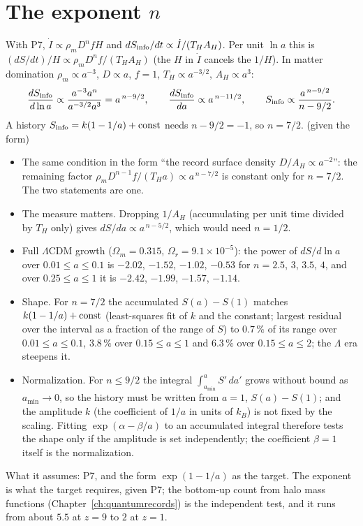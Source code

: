 \section{The exponent $n$}\label{app:der:exponent}
With P7, $\dot I\propto\rho_mD^nfH$ and $dS_{\rm info}/dt\propto\dot I/(T_HA_H)$. Per unit $\ln a$ this is $(dS/dt)/H\propto\rho_mD^nf/(T_HA_H)$ (the $H$ in
$\dot I$ cancels the $1/H$). In matter domination $\rho_m\propto a^{-3}$, $D\propto a$, $f=1$, $T_H\propto a^{-3/2}$, $A_H\propto a^3$:
\begin{equation}
\frac{dS_{\rm info}}{d\ln a}\propto\frac{a^{-3}a^n}{a^{-3/2}a^3}=a^{\,n-9/2},\qquad
\frac{dS_{\rm info}}{da}\propto a^{\,n-11/2},\qquad S_{\rm info}\propto\frac{a^{\,n-9/2}}{n-9/2}.
\end{equation}
A history $S_{\rm info}=k(1-1/a)+{\rm const}$ needs $n-9/2=-1$, so $n=7/2$. \derived{} (given the form)
\begin{itemize}
\item The same condition in the form ``the record surface density $D/A_H\propto a^{-2}$'': the remaining factor $\rho_mD^{n-1}f/(T_Ha)\propto a^{\,n-7/2}$ is
constant only for $n=7/2$. The two statements are one. \derived
\item The measure matters. Dropping $1/A_H$ (accumulating per unit time divided by $T_H$ only) gives $dS/da\propto a^{\,n-5/2}$, which would need $n=1/2$. \derived
\item Full $\Lambda$CDM growth ($\Omega_m=0.315$, $\Omega_r=9.1\times10^{-5}$): the power of $dS/d\ln a$ over $0.01\le a\le0.1$ is $-2.02$, $-1.52$, $-1.02$,
$-0.53$ for $n=2.5$, $3$, $3.5$, $4$, and over $0.25\le a\le1$ it is $-2.42$, $-1.99$, $-1.57$, $-1.14$. \calc
\item Shape. For $n=7/2$ the accumulated $S(a)-S(1)$ matches $k(1-1/a)+{\rm const}$ (least-squares fit of $k$ and the constant; largest residual over the interval as a fraction of the range of $S$) to $0.7\,\%$ of its range over $0.01\le a\le0.1$, $3.8\,\%$ over
$0.15\le a\le1$ and $6.3\,\%$ over $0.15\le a\le2$; the $\Lambda$ era steepens it. \calc
\item Normalization. For $n\le9/2$ the integral $\int_{a_{\min}}^aS'\,da'$ grows without bound as $a_{\min}\to0$, so the history must be written from
$a=1$, $S(a)-S(1)$; and the amplitude $k$ (the coefficient of $1/a$ in units of $k_B$) is not fixed by the scaling. Fitting $\exp(\alpha-\beta/a)$ to an
accumulated integral therefore tests the shape only if the amplitude is set independently; the coefficient $\beta=1$ itself is the
normalization. \openprob
\end{itemize}
What it assumes: P7, and the form $\exp(1-1/a)$ as the target. The exponent is what the target requires, given P7; the bottom-up count from halo mass
functions (Chapter~\ref{ch:quantumrecords}) is the independent test, and it runs from about $5.5$ at $z=9$ to $2$ at $z=1$.

